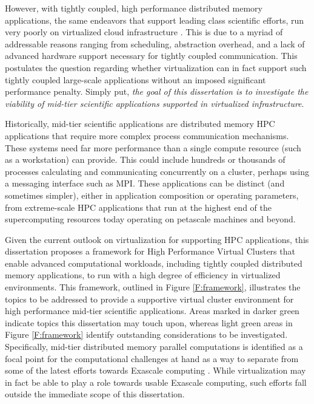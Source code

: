 However, with tightly coupled, high performance distributed memory applications, the same endeavors that support leading class scientific efforts, run very poorly on virtualized cloud infrastructure \cite{ostermann2009performance}.  This is due to a myriad of addressable reasons ranging from scheduling, abstraction overhead, and a lack of advanced hardware support necessary for tightly coupled communication. This postulates the question regarding whether virtualization can in fact support such tightly coupled large-scale applications without an imposed significant performance penalty. Simply put, \emph{the goal of this dissertation is to investigate the viability of mid-tier scientific applications supported in virtualized infrastructure}.  

Historically, mid-tier scientific applications are distributed memory HPC applications that require more complex process communication mechanisms. These systems need far more performance than a single compute resource (such as a workstation) can provide. This could include hundreds or thousands of processes calculating and communicating concurrently on a cluster, perhaps using a messaging interface such as MPI.  These applications can be distinct (and sometimes simpler), either in application composition or operating parameters, from extreme-scale HPC applications that run at the highest end of the supercomputing resources today operating on petascale machines and beyond.  




Given the current outlook on virtualization for supporting HPC applications, this dissertation proposes a framework for High Performance Virtual Clusters that enable advanced computational workloads, including tightly coupled distributed memory applications, to run with a high degree of efficiency  in virtualized environments. This framework, outlined in Figure \ref{F:framework}, illustrates the topics to be addressed to provide a supportive virtual cluster environment for high performance mid-tier scientific applications.  Areas marked in darker green indicate topics this dissertation may touch upon, whereas light green areas in Figure \ref{F:framework} identify outstanding considerations to be investigated. Specifically, mid-tier distributed memory parallel computations is identified as a focal point for the computational challenges at hand as a way to separate from some of the latest efforts towards Exascale computing \cite{dongarra2011exascale, bergman2008exascale, shalf2010exascale}.  While virtualization may in fact be able to play a role towards usable Exascale computing, such efforts fall outside the immediate scope of this dissertation. 


